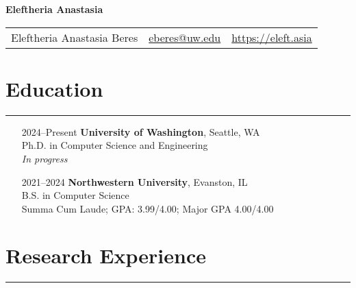 \documentclass{article}
\begin{document}

\begin{center}
    \textbf{\huge{Eleftheria Anastasia}}

    \vspace{10pt}

    \begin{tabular}{c c c}
        Eleftheria Anastasia Beres & \href{mailto:eberes@cs.washington.edu}{eberes@uw.edu} &  \href{https://eleft.asia}{https://eleft.asia}
    \end{tabular}
    
\end{center}

\section*{Education}
\hrule
\vspace{10pt}

\begin{itemize}[leftmargin=1.5in]
    \item[2024–Present] \textbf{University of Washington}, Seattle, WA\\
    Ph.D. in Computer Science and Engineering\\
    \textit{In progress}
    \item[2021–2024] \textbf{Northwestern University}, Evanston, IL\\
    B.S. in Computer Science\\
    Summa Cum Laude; GPA: 3.99/4.00; Major GPA 4.00/4.00
\end{itemize}



\section*{Research Experience}
\hrule
\vspace{10pt}
\end{document}
